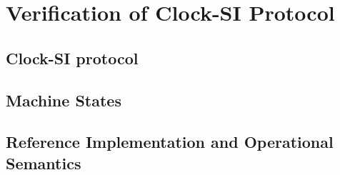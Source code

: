 \makeatletter
{}
\makeatother


%


\section{Verification of Clock-SI Protocol} \label{sec:clock-si} 
\label{sec:applications-impl}
    \subsection{Clock-SI protocol} \label{sec:clock-si-protocol-description}  
    \subsection{Machine States} \label{sec:clock-si-model}  
    \subsection{Reference Implementation and Operational Semantics} \label{sec:clock-si-semantics}  
